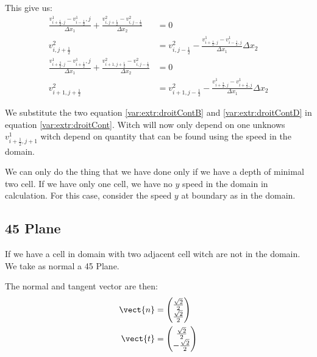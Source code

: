 This give us:
\begin{align}
\label{var:extr:droitContA}
	\frac{v^{1}_{i+\frac{1}{2},j}-v^{1}_{i-\frac{1}{2}},j}{\Delta x_{1}}+\frac{v^{2}_{i,j+\frac{1}{2}}-v^{2}_{i,j-\frac{1}{2}}}{\Delta x_2}&=0\\
\label{var:extr:droitContB}
	v^{2}_{i,j+\frac{1}{2}}&=v^{2}_{i,j-\frac{1}{2}}-\frac{v^{1}_{i+\frac{1}{2},j}-v^{1}_{i-\frac{1}{2},j}}{\Delta x_{1}}\Delta x_{2}\\
\label{var:extr:droitContC}
	\frac{v^{1}_{i+\frac{3}{2},j}-v^{1}_{i+\frac{1}{2}},j}{\Delta x_{1}}+\frac{v^{2}_{i+1,j+\frac{1}{2}}-v^{2}_{i,j-\frac{1}{2}}}{\Delta x_2}&=0\\
\label{var:extr:droitContD}
	v^{2}_{i+1,j+\frac{1}{2}}&=v^{2}_{i+1,j-\frac{1}{2}}-\frac{v^{1}_{i+\frac{3}{2},j}-v^{1}_{i+\frac{1}{2},j}}{\Delta x_{1}}\Delta x_{2}
\end{align}

We substitute the two equation \ref{var:extr:droitContB} and \ref{var:extr:droitContD} in equation \ref{var:extr:droitCont}.
Witch will now only depend on one unknows $v^{1}_{i+\frac{1}{2},j+1}$ witch depend on quantity that can be found using the speed in the domain.

We can only do the thing that we have done only if we have a depth of minimal two cell.
If we have only one cell, we have no $y$ speed in the domain in calculation.
For this case, consider the speed $y$ at boundary as in the domain.

\subsection{\unit{45}{\degree} Plane}

If we have a cell in domain with two adjacent cell witch are not in the domain.
We take as normal a \unit{45}{\degree} Plane.

The normal and tangent vector are then:
\begin{align}
	\vect{n}&=\begin{pmatrix}
	\frac{\sqrt{2}}{2}\\
	\frac{\sqrt{2}}{2}
	  \end{pmatrix}\\
	\vect{t}&=\begin{pmatrix}
	          	\frac{\sqrt{2}}{2}\\
	          	-\frac{\sqrt{2}}{2}
	          \end{pmatrix}
\end{align}

